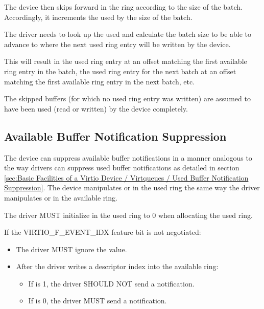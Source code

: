 The device then skips forward in the ring according to the size of
the batch. Accordingly, it increments the used  by the
size of the batch.

The driver needs to look up the used  and
calculate the batch size to be able to advance to where the next
used ring entry will be written by the device.

This will result in the used ring entry at an offset matching the
first available ring entry in the batch, the used ring entry for
the next batch at an offset matching the first available ring
entry in the next batch, etc.

The skipped buffers (for which no used ring entry was written)
are assumed to have been used (read or written) by the
device completely.

\subsection{Available Buffer Notification Suppression}\label{sec:Basic Facilities of a Virtio Device / Virtqueues / Virtqueue Notification Suppression}

The device can suppress available buffer notifications in a manner
analogous to the way drivers can suppress used buffer notifications as
detailed in section \ref{sec:Basic Facilities of a Virtio Device /
Virtqueues / Used Buffer Notification Suppression}.
The device manipulates  or  in the used ring the
same way the driver manipulates  or  in the available ring.


The driver MUST initialize  in the used ring to 0 when
allocating the used ring.

If the VIRTIO_F_EVENT_IDX feature bit is not negotiated:
\begin{itemize}
\item The driver MUST ignore the  value.
\item After the driver writes a descriptor index into the available ring:
  \begin{itemize}
        \item If  is 1, the driver SHOULD NOT send a notification.
        \item If  is 0, the driver MUST send a notification.
  \end{itemize}
\end{itemize}

